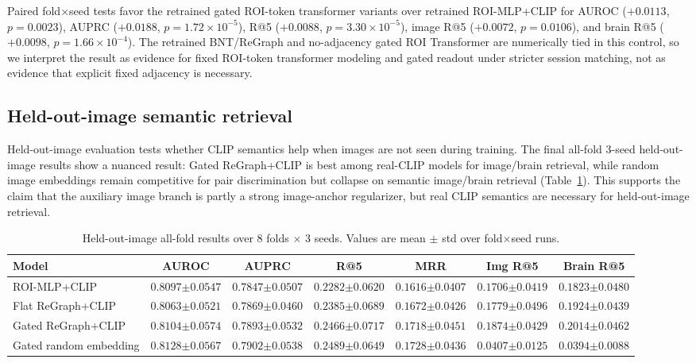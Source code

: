 \documentclass{article}
\begin{document}
Paired fold$\times$seed tests favor the retrained gated ROI-token transformer variants over retrained ROI-MLP+CLIP for AUROC ($+0.0113$, $p=0.0023$), AUPRC ($+0.0188$, $p=1.72\times10^{-5}$), R@5 ($+0.0088$, $p=3.30\times10^{-5}$), image R@5 ($+0.0072$, $p=0.0106$), and brain R@5 ($+0.0098$, $p=1.66\times10^{-4}$). The retrained BNT/ReGraph and no-adjacency gated ROI Transformer are numerically tied in this control, so we interpret the result as evidence for fixed ROI-token transformer modeling and gated readout under stricter session matching, not as evidence that explicit fixed adjacency is necessary.

\subsection{Held-out-image semantic retrieval}

Held-out-image evaluation tests whether CLIP semantics help when images are not seen during training. The final all-fold 3-seed held-out-image results show a nuanced result: Gated ReGraph+CLIP is best among real-CLIP models for image/brain retrieval, while random image embeddings remain competitive for pair discrimination but collapse on semantic image/brain retrieval (Table~\ref{tab:heldout}). This supports the claim that the auxiliary image branch is partly a strong image-anchor regularizer, but real CLIP semantics are necessary for held-out-image retrieval.

\begin{table}[!htbp]
  \centering
  \caption{Held-out-image all-fold results over 8 folds $\times$ 3 seeds. Values are mean $\pm$ std over fold$\times$seed runs.}
  \label{tab:heldout}
  \scriptsize
  \setlength{\tabcolsep}{3.5pt}
  \renewcommand{\arraystretch}{1.15}
  \begin{tabular}{lcccccc}
    \toprule
    Model & AUROC & AUPRC & R@5 & MRR & Img R@5 & Brain R@5 \\
    \midrule
    ROI-MLP+CLIP & $0.8097{\scriptstyle\pm0.0547}$ & $0.7847{\scriptstyle\pm0.0507}$ & $0.2282{\scriptstyle\pm0.0620}$ & $0.1616{\scriptstyle\pm0.0407}$ & $0.1706{\scriptstyle\pm0.0419}$ & $0.1823{\scriptstyle\pm0.0480}$ \\
    Flat ReGraph+CLIP & $0.8063{\scriptstyle\pm0.0521}$ & $0.7869{\scriptstyle\pm0.0460}$ & $0.2385{\scriptstyle\pm0.0689}$ & $0.1672{\scriptstyle\pm0.0426}$ & $0.1779{\scriptstyle\pm0.0496}$ & $0.1924{\scriptstyle\pm0.0439}$ \\
    Gated ReGraph+CLIP & $0.8104{\scriptstyle\pm0.0574}$ & $0.7893{\scriptstyle\pm0.0532}$ & $0.2466{\scriptstyle\pm0.0717}$ & $0.1718{\scriptstyle\pm0.0451}$ & $\mathbf{0.1874{\scriptstyle\pm0.0429}}$ & $\mathbf{0.2014{\scriptstyle\pm0.0462}}$ \\
    Gated random embedding & $\mathbf{0.8128{\scriptstyle\pm0.0567}}$ & $\mathbf{0.7902{\scriptstyle\pm0.0538}}$ & $\mathbf{0.2489{\scriptstyle\pm0.0649}}$ & $\mathbf{0.1728{\scriptstyle\pm0.0436}}$ & $0.0407{\scriptstyle\pm0.0125}$ & $0.0394{\scriptstyle\pm0.0088}$ \\
    \bottomrule
  \end{tabular}
\end{table}
\end{document}

